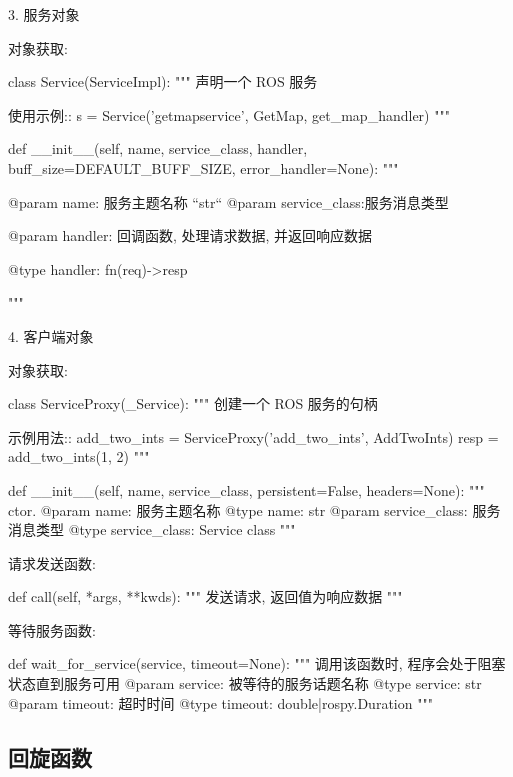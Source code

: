 \documentclass[openany, fontset=windowsold]{ctexbook}
\theoremstyle{kaiti}
\theoremstyle{normal}
\begin{document}
3. 服务对象

对象获取:

\begin{python}
  class Service(ServiceImpl):
      """
      声明一个 ROS 服务

      使用示例::
        s = Service('getmapservice', GetMap, get_map_handler)
      """

      def __init__(self, name, service_class, handler,
                  buff_size=DEFAULT_BUFF_SIZE, error_handler=None):
          """

          @param name: 服务主题名称 ``str``
          @param service_class:服务消息类型

          @param handler: 回调函数, 处理请求数据, 并返回响应数据

          @type  handler: fn(req)->resp

          """
\end{python}

4. 客户端对象

对象获取:

\begin{python}
  class ServiceProxy(_Service):
      """
    创建一个 ROS 服务的句柄

      示例用法::
        add_two_ints = ServiceProxy('add_two_ints', AddTwoInts)
        resp = add_two_ints(1, 2)
      """

      def __init__(self, name, service_class, persistent=False, headers=None):
          """
          ctor.
          @param name: 服务主题名称
          @type  name: str
          @param service_class: 服务消息类型
          @type  service_class: Service class
          """
\end{python}

请求发送函数:

\begin{python}
  def call(self, *args, **kwds):
          """
          发送请求, 返回值为响应数据
          """
\end{python}

等待服务函数:

\begin{python}
  def wait_for_service(service, timeout=None):
      """
      调用该函数时, 程序会处于阻塞状态直到服务可用
      @param service: 被等待的服务话题名称
      @type  service: str
      @param timeout: 超时时间
      @type  timeout: double|rospy.Duration
      """
\end{python}

\subsection{回旋函数}
\end{document}
